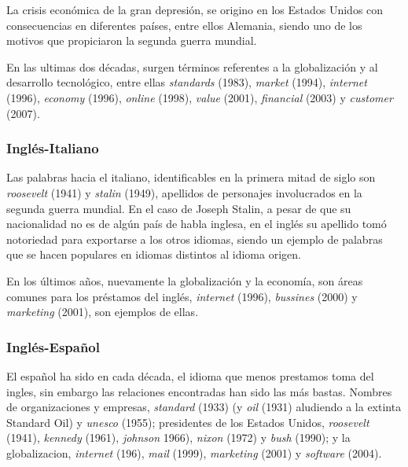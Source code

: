 La crisis económica de la gran depresión, se origino en los Estados Unidos con consecuencias en diferentes países, entre ellos  Alemania, siendo uno de los motivos que propiciaron la segunda guerra mundial.

En las ultimas dos décadas, surgen términos referentes a la globalización y al desarrollo tecnológico, entre ellas \textit{standards} (1983), \textit{market} (1994), \textit{internet} (1996), \textit{economy} (1996), \textit{online} (1998), \textit{value} (2001), \textit{financial} (2003) y \textit{customer} (2007). 

\subsubsection*{Inglés-Italiano} %


Las palabras hacia el italiano, identificables en la primera mitad de siglo son \textit{roosevelt} (1941) y \textit{stalin} (1949), apellidos de personajes involucrados en la segunda guerra mundial. En el caso de Joseph Stalin, a pesar de que su nacionalidad no es de algún país de habla inglesa, en el inglés su apellido tomó notoriedad para exportarse a los otros idiomas, siendo un ejemplo de palabras que se hacen populares en idiomas distintos al idioma origen. 

En los últimos años, nuevamente la globalización y la economía, son áreas comunes para los préstamos del inglés, \textit{internet} (1996), \textit{bussines} (2000) y \textit{marketing} (2001), son ejemplos de ellas. 


\subsubsection*{Inglés-Español} 

El español ha sido en cada década,  el idioma que menos prestamos toma del ingles, sin embargo las relaciones encontradas han sido las más bastas.  Nombres de organizaciones y empresas,  \textit{standard} (1933) (y \textit{oil} (1931) aludiendo a la extinta Standard Oil) y \textit{unesco} (1955);  presidentes de los Estados Unidos,  \textit{roosevelt} (1941), \textit{kennedy} (1961), \textit{johnson} 1966),  \textit{nixon} (1972) y \textit{bush} (1990); y la globalizacion, \textit{internet} (196), \textit{mail} (1999), \textit{marketing} (2001) y \textit{software} (2004).   


